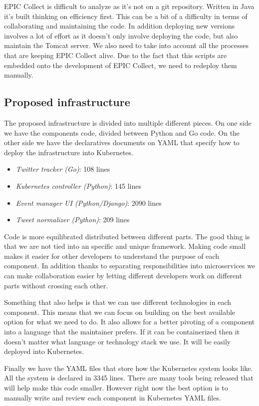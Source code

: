 EPIC Collect is difficult to analyze as it’s not on a git repository. Written in Java it’s built thinking on efficiency first.  This can be a bit of a difficulty in terms of collaborating and maintaining the code. In addition deploying new versions involves a lot of effort as it doesn’t only involve deploying the code, but also maintain the Tomcat server. We also need to take into account all the processes that are keeping EPIC Collect alive. Due to the fact that this scripts are embedded onto the development of EPIC Collect, we need to redeploy them manually.

\subsection{Proposed infrastructure}

The proposed infrastructure is divided into multiple different pieces. On one side we have the components code, divided between Python and Go code. On the other side we have the declaratives documents on YAML that specify how to deploy the infrastructure into Kubernetes.

\begin{itemize}
	\item \textit{Twitter tracker (Go)}: 108 lines 
	\item \textit{Kubernetes controller (Python)}: 145 lines
	\item \textit{Event manager UI (Python/Django)}: 2090 lines
	\item \textit{Tweet normalizer (Python)}: 209 lines
\end{itemize}

Code is more equilibrated distributed between different parts. The good thing is that we are not tied into an specific and unique framework. Making code small makes it easier for other developers to understand the purpose of each component. In addition thanks to separating responsibilities into microservices we can make collaboration easier by letting different developers work on different parts without crossing each other.

Something that also helps is that we can use different technologies in each component. This means that we can focus on building on the best available option for what we need to do. It also allows for a better pivoting of a component into a language that the maintainer prefers. If it can be containerized then it doesn’t matter what language or technology stack we use. It will be easily deployed into Kubernetes.

Finally we have the YAML files that store how the Kubernetes system looks like. All the system is declared in 3345 lines. There are many tools being released that will help make this code smaller. However right now the best option is to manually write and review each component in Kubernetes YAML files.


